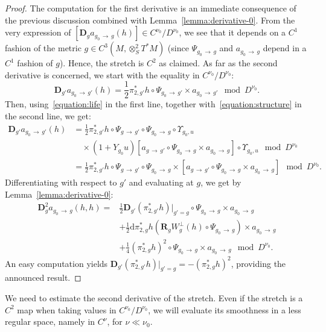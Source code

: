\documentclass[AHL,Unicode,longabstracts,published]{cedram}
\newcommand{\RR}{\mathbf{R}}
\newcommand{\bdD}{\mathbf{D}}
\newcommand{\dd}{\mathrm{d}}
\begin{document}
\begin{proof}
The computation for the first derivative is an immediate consequence of the previous discussion combined with Lemma~\ref{lemma:derivative-0}. From the very expression of $[\bdD_g a_{g_0\,\to \,g} (h)] \in C^{\nu_0}/D^{\nu_0}$, we see that it depends on a $C^1$ fashion of the metric $g \in C^3(M,\otimes^2_S T^*M)$ (since $\Psi_{g_0 \,\to\,g}$ and $a_{g_0\,\to\,g}$ depend in a $C^1$ fashion of $g$). Hence, the stretch is $C^2$ as claimed. As far as the second derivative is concerned, we start with the equality in $C^{\nu_0}/D^{\nu_0}$:
\[
\bdD_{g'} a_{g_0\,\to\,g'} (h) = \frac{1}{2}\pi_{2,g'}^\ast h \circ \Psi_{g_0\,\to\,g'} \times a_{g_0\,\to\,g'} \mod D^{\nu_0}.
\]
Then, using~\eqref{equation:life} in the first line, together with~\eqref{equation:structure} in the second line, we get:
\begin{align*}
\bdD_{g'} a_{g_0\,\to\,g'} (h) 
&= \frac{1}{2}\pi_{2,g'}^\ast h \circ \Psi_{g\,\to\,g'} \circ \Psi_{g_0\,\to\,g}\circ \Upsilon_{g_0,u}\\
&\quad \times \left(1 + Y_{g_0} u\right) \left[a_{g\,\to\,g'} \circ \Psi_{g_0\,\to\,g} \times a_{g_0\,\to\,g}\right] \circ \Upsilon_{g_0,u} \mod D^{\nu_0} \\
& = \frac{1}{2}\pi_{2,g'}^\ast h \circ \Psi_{g\,\to\,g'} \circ \Psi_{g_0\,\to\,g} \times \left[a_{g\,\to\,g'} \circ \Psi_{g_0\,\to\,g} \times a_{g_0\,\to\,g}\right] \mod D^{\nu_0}.
\end{align*}
Differentiating with respect to $g'$ and evaluating at $g$, we get by Lemma~\ref{lemma:derivative-0}:
\begin{align*}
\bdD^2_{g} a_{g_0\,\to\,g}(h,h)
 =& \frac{1}{2} \bdD_{g'}\left(\pi_{2,g'}^\ast h\right)|_{g'=g} \circ \Psi_{g_0\,\to\,g} \times a_{g_0 \,\to\,g}\\
& + \frac{1}{2} \dd \pi_{2,g}^\ast h\left(\RR_g W^\bot_g(h) \circ \Psi_{g_0\,\to\,g} \right) \times a_{g_0\,\to\,g} \\
& + \frac{1}{4} \left(\pi_{2,g}^\ast h\right)^2 \circ \Psi_{g_0\,\to\,g} \times a_{g_0\,\to\,g} \mod D^{\nu_0}.
\end{align*}
An easy computation yields $\bdD_{g'}(\pi_{2,g'}^\ast h)|_{g'=g} = -(\pi_{2,g}^\ast h)^2$, providing the announced result.
\end{proof}


We need to estimate the second derivative of the stretch. Even if the stretch is a $C^2$ map when taking values in $C^{\nu_0}/D^{\nu_0}$, we will evaluate its smoothness in a less regular space, namely in $C^{\nu}$, for $\nu \ll \nu_0$.
\end{document}
